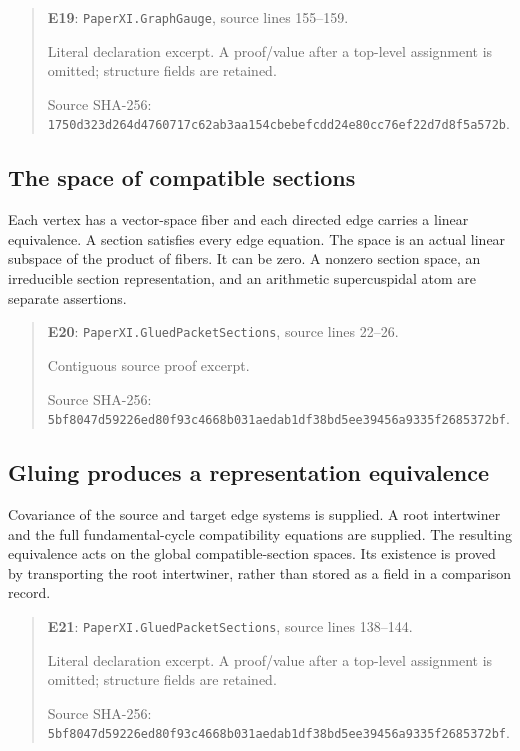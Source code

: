 \documentclass[10pt,oneside]{book}
\begin{document}
\begin{quote}\footnotesize\textbf{E19}: \nolinkurl{PaperXI.GraphGauge}, source lines 155--159.\par Literal declaration excerpt. A proof/value after a top-level assignment is omitted; structure fields are retained.\par Source SHA-256: {\scriptsize\texttt{1750d323d264d4760717c62ab3aa154cbebefcdd24e80cc76ef22d7d8f5a572b}}.\end{quote}


\subsection{The space of compatible sections}
\label{guide:E20}
Each vertex has a vector-space fiber and each directed edge carries a linear equivalence. A section satisfies every edge equation.
The space is an actual linear subspace of the product of fibers. It can be zero. A nonzero section space, an irreducible section representation, and an arithmetic supercuspidal atom are separate assertions.

\begin{quote}\footnotesize\textbf{E20}: \nolinkurl{PaperXI.GluedPacketSections}, source lines 22--26.\par Contiguous source proof excerpt.\par Source SHA-256: {\scriptsize\texttt{5bf8047d59226ed80f93c4668b031aedab1df38bd5ee39456a9335f2685372bf}}.\end{quote}


\subsection{Gluing produces a representation equivalence}
\label{guide:E21}
Covariance of the source and target edge systems is supplied. A root intertwiner and the full fundamental-cycle compatibility equations are supplied.
The resulting equivalence acts on the global compatible-section spaces. Its existence is proved by transporting the root intertwiner, rather than stored as a field in a comparison record.

\begin{quote}\footnotesize\textbf{E21}: \nolinkurl{PaperXI.GluedPacketSections}, source lines 138--144.\par Literal declaration excerpt. A proof/value after a top-level assignment is omitted; structure fields are retained.\par Source SHA-256: {\scriptsize\texttt{5bf8047d59226ed80f93c4668b031aedab1df38bd5ee39456a9335f2685372bf}}.\end{quote}
\end{document}
